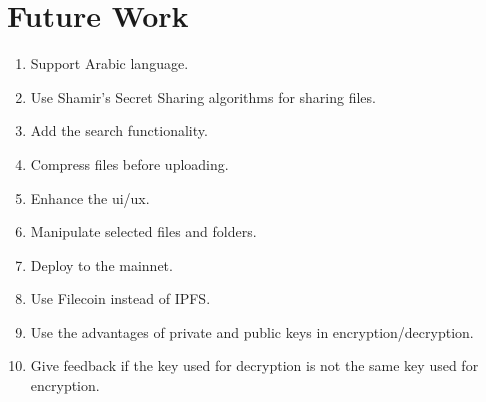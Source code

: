 \section{Future Work}

\begin{enumerate}
\item Support Arabic language.
\item Use Shamir's Secret Sharing algorithms for sharing files.
\item Add the search functionality.
\item Compress files before uploading.
\item Enhance the ui/ux.
\item Manipulate selected files and folders.
\item Deploy to the mainnet.
\item Use Filecoin instead of IPFS.
\item Use the advantages of private and public keys in encryption/decryption.
\item Give feedback if the key used for decryption is not the same key used for encryption.
\end{enumerate}